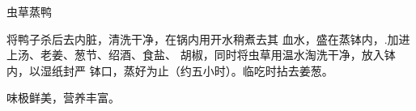 \begin{recipe}{虫草蒸鸭}

\ingredients




\cooking

将鸭子杀后去内脏，清洗干净，在锅内用开水稍煮去其 血水，盛在蒸钵内，.加进上汤、老姜、葱节、绍酒、食盐、 胡椒，同时将虫草用温水淘洗干净，放入钵内，以湿纸封严 钵口，蒸好为止（约五小时）。临吃时拈去姜葱。

\notes

味极鲜美，营养丰富。

\end{recipe}

